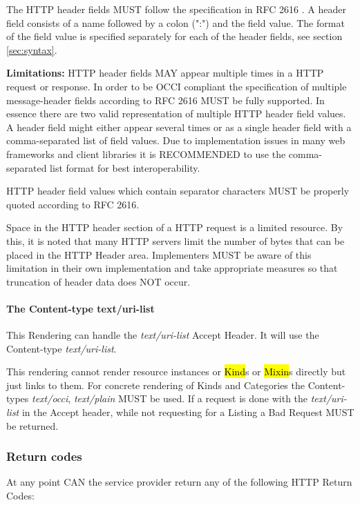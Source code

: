 \documentclass[10pt,a4paper]{article}
\begin{document}
The HTTP header fields MUST follow the specification in RFC 2616
\cite{rfc2616}. A header field consists of a name followed by a colon
(":") and the field value. The format of the field value is specified
separately for each of the header fields, see section
\ref{sec:syntax}.

\textbf{Limitations: } HTTP header fields MAY appear multiple times in
a HTTP request or response. In order to be OCCI compliant the
specification of multiple message-header fields according to RFC 2616
MUST be fully supported. In essence there are two valid representation
of multiple HTTP header field values. A header field might either
appear several times or as a single header field with a
comma-separated list of field values. Due to implementation issues in
many web frameworks and client libraries it is RECOMMENDED to use the
comma-separated list format for best interoperability.

HTTP header field values which contain separator characters MUST be
properly quoted according to RFC 2616.

Space in the HTTP header section of a HTTP request is a limited
resource. By this, it is noted that many HTTP servers limit the number
of bytes that can be placed in the HTTP Header area. Implementers MUST
be aware of this limitation in their own implementation and take
appropriate measures so that truncation of header data does NOT
occur.

\paragraph{The Content-type text/uri-list}
This Rendering can handle the \textit{text/uri-list} Accept Header. It
will use the Content-type \textit{text/uri-list}.

This rendering cannot render resource instances or \hl{Kind}s or
\hl{Mixin}s directly but just links to them. For concrete rendering of
Kinds and Categories the Content-types \textit{text/occi},
\textit{text/plain} MUST be used. If a request is done with the
\textit{text/uri-list} in the Accept header, while not requesting for
a Listing a Bad Request MUST be returned.

\subsubsection{Return codes}
\label{sec:return_codes}
At any point CAN the service provider return any of the following HTTP
Return Codes:
\end{document}
